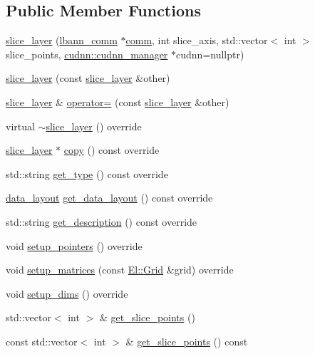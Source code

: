 \subsection*{Public Member Functions}
\begin{DoxyCompactItemize}
\item 
\hyperlink{classlbann_1_1slice__layer_a248cf99da690964ac0209684f8c13c1d}{slice\+\_\+layer} (\hyperlink{classlbann_1_1lbann__comm}{lbann\+\_\+comm} $\ast$\hyperlink{file__io_8cpp_ab048c6f9fcbcfaa57ce68b00263dbebe}{comm}, int slice\+\_\+axis, std\+::vector$<$ int $>$ slice\+\_\+points, \hyperlink{classlbann_1_1cudnn_1_1cudnn__manager}{cudnn\+::cudnn\+\_\+manager} $\ast$cudnn=nullptr)
\item 
\hyperlink{classlbann_1_1slice__layer_a650cf86c43a81a644bff4b8e9375f87f}{slice\+\_\+layer} (const \hyperlink{classlbann_1_1slice__layer}{slice\+\_\+layer} \&other)
\item 
\hyperlink{classlbann_1_1slice__layer}{slice\+\_\+layer} \& \hyperlink{classlbann_1_1slice__layer_a24fb9ce808d587210faa4e3b34dc1aff}{operator=} (const \hyperlink{classlbann_1_1slice__layer}{slice\+\_\+layer} \&other)
\item 
virtual \hyperlink{classlbann_1_1slice__layer_a12591fe9fbadca1a0345682c11788b03}{$\sim$slice\+\_\+layer} () override
\item 
\hyperlink{classlbann_1_1slice__layer}{slice\+\_\+layer} $\ast$ \hyperlink{classlbann_1_1slice__layer_a8c2b93a3ed24b239cc429ee85ee7ef29}{copy} () const override
\item 
std\+::string \hyperlink{classlbann_1_1slice__layer_aa7c27032d75d8e0d36a76b0763c4f215}{get\+\_\+type} () const override
\item 
\hyperlink{base_8hpp_a786677cbfb3f5677b4d84f3056eb08db}{data\+\_\+layout} \hyperlink{classlbann_1_1slice__layer_a5121b600d26654707289726e84c0eed9}{get\+\_\+data\+\_\+layout} () const override
\item 
std\+::string \hyperlink{classlbann_1_1slice__layer_aa61c1f449a9f741f523921129dfb88e5}{get\+\_\+description} () const override
\item 
void \hyperlink{classlbann_1_1slice__layer_a701854f5906a25c58d4f9d851b20de29}{setup\+\_\+pointers} () override
\item 
void \hyperlink{classlbann_1_1slice__layer_af3b6f79a53c9a80908b37c2587ff2cae}{setup\+\_\+matrices} (const \hyperlink{base_8hpp_a9951bb1719d534e0401b1f06cad19eab}{El\+::\+Grid} \&grid) override
\item 
void \hyperlink{classlbann_1_1slice__layer_ac43785fc01d6cf6e49d3677adfaac297}{setup\+\_\+dims} () override
\item 
std\+::vector$<$ int $>$ \& \hyperlink{classlbann_1_1slice__layer_a5c02b2a15355be051f93e72f3b2803ce}{get\+\_\+slice\+\_\+points} ()
\item 
const std\+::vector$<$ int $>$ \& \hyperlink{classlbann_1_1slice__layer_a88936fbabd04b06be6cf732fc5b73317}{get\+\_\+slice\+\_\+points} () const
\end{DoxyCompactItemize}
